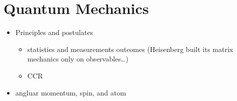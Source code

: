 \documentclass[letterpaper,10pt,english]{jupyterBook}
\begin{document}
\sphinxstepscope


\chapter{Quantum Mechanics}
\label{\detokenize{ch/quantum-mechanics/intro:quantum-mechanics}}\label{\detokenize{ch/quantum-mechanics/intro:quantum-mechanics-intro}}\label{\detokenize{ch/quantum-mechanics/intro::doc}}\begin{itemize}
\item {} 
\sphinxAtStartPar
Principles and postulates
\begin{itemize}
\item {} 
\sphinxAtStartPar
statistics and measurements outcomes (Heisenberg built its matrix mechanics only on observables…)

\item {} 
\sphinxAtStartPar
CCR

\end{itemize}

\item {} 
\sphinxAtStartPar
angluar momentum, spin, and atom

\end{itemize}
\end{document}
